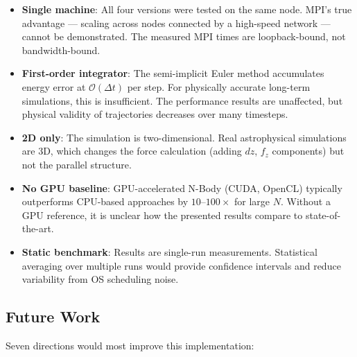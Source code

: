 ﻿\documentclass[12pt,a4paper]{article}
\begin{document}
\begin{itemize}
    \item \textbf{Single machine}: All four versions were tested on the same
          node. MPI's true advantage --- scaling across nodes connected by a
          high-speed network --- cannot be demonstrated. The measured MPI
          times are loopback-bound, not bandwidth-bound.

        \item \textbf{First-order integrator}: The semi-implicit Euler method
            accumulates energy error at $\mathcal{O}(\Delta t)$ per step. For physically
          accurate long-term simulations, this is insufficient. The
          performance results are unaffected, but physical validity of
          trajectories decreases over many timesteps.

    \item \textbf{2D only}: The simulation is two-dimensional. Real
          astrophysical simulations are 3D, which changes the force
          calculation (adding $dz$, $f_z$ components) but not the parallel
          structure.

    \item \textbf{No GPU baseline}: GPU-accelerated N-Body (CUDA, OpenCL)
          typically outperforms CPU-based approaches by $10$--$100\times$
          for large $N$. Without a GPU reference, it is unclear how the
          presented results compare to state-of-the-art.

    \item \textbf{Static benchmark}: Results are single-run measurements.
          Statistical averaging over multiple runs would provide confidence
          intervals and reduce variability from OS scheduling noise.
\end{itemize}

\subsection{Future Work}

Seven directions would most improve this implementation:
\end{document}
